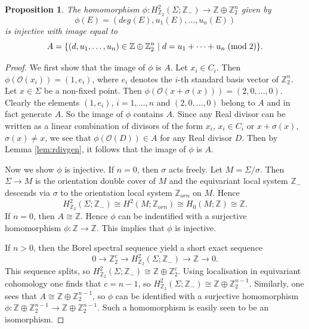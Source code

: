 \documentclass{amsart}
\newtheorem{proposition}[theorem]{Proposition}
\theoremstyle{definition}
\theoremstyle{remark}
\numberwithin{equation}{section}
\begin{document}
\begin{proposition}\label{prop:deg2}
The homomorphism $\phi : H^2_{\mathbb{Z}_2}(\Sigma ; \mathbb{Z}_-) \to \mathbb{Z} \oplus \mathbb{Z}_2^n$ given by
\[
\phi(E) = ( deg(E) , u_1(E) , \dots , u_n(E))
\]
is injective with image equal to 
\[
A = \{ (d , u_1 , \dots , u_n) \in \mathbb{Z} \oplus \mathbb{Z}_2^n \; | \; d = u_1 + \cdots + u_n \; ({\rm mod} \; 2) \}.
\]
\end{proposition}
\begin{proof}
We first show that the image of $\phi$ is $A$. Let $x_i \in C_i$. Then $\phi( \mathcal{O}(x_i) ) = (1 , e_i )$, where $e_i$ denotes the $i$-th standard basis vector of $\mathbb{Z}_2^n$. Let $x \in \Sigma$ be a non-fixed point. Then $\phi( \mathcal{O}(x+\sigma(x)) ) = (2 , 0 , \dots , 0)$. Clearly the elements $(1 , e_i)$, $i = 1, \dots , n$ and $(2 , 0 , \dots , 0)$ belong to $A$ and in fact generate $A$. So the image of $\phi$ contains $A$. Since any Real divisor can be written as a linear combination of divisors of the form $x_i$, $x_i \in C_i$ or $x + \sigma(x)$, $\sigma(x) \neq x$, we see that $\phi( \mathcal{O}(D) ) \in A$ for any Real divisor $D$. Then by Lemma \ref{lem:rdivgen}, it follows that the image of $\phi$ is $A$.

Now we show $\phi$ is injective. If $n = 0$, then $\sigma$ acts freely. Let $M = \Sigma/\sigma$. Then $\Sigma \to M$ is the orientation double cover of $M$ and the equivariant local system $\mathbb{Z}_-$ descends via $\sigma$ to the orientation local system $\mathbb{Z}_{orn}$ on $M$. Hence
\[
H^2_{\mathbb{Z}_2}(\Sigma ; \mathbb{Z}_-) \cong H^2(M ; \mathbb{Z}_{orn}) \cong H_0(M ; \mathbb{Z}) \cong \mathbb{Z}.
\]
If $n=0$, then $A \cong \mathbb{Z}$. Hence $\phi$ can be indentified with a surjective homomorphism $\phi : \mathbb{Z} \to \mathbb{Z}$. This implies that $\phi$ is injective.

If $n > 0$, then the Borel spectral sequence yield a short exact sequence
\[
0 \to \mathbb{Z}_2^c \to H^2_{\mathbb{Z}_2}(\Sigma ; \mathbb{Z}_-) \to \mathbb{Z} \to 0.
\]
This sequence splits, so $H^2_{\mathbb{Z}_2}(\Sigma ; \mathbb{Z}_-) \cong \mathbb{Z} \oplus \mathbb{Z}_2^c$. Using localisation in equivariant cohomology one finds that $c = n-1$, so $H^2_{\mathbb{Z}_2}(\Sigma ; \mathbb{Z}_-) \cong \mathbb{Z} \oplus \mathbb{Z}_2^{n-1}$. Similarly, one sees that $A \cong \mathbb{Z} \oplus \mathbb{Z}_2^{n-1}$, so $\phi$ can be identified with a surjective homomorphism $\phi : \mathbb{Z} \oplus \mathbb{Z}_2^{n-1} \to \mathbb{Z} \oplus \mathbb{Z}_2^{n-1}$. Such a homomorphism is easily seen to be an isomorphism.
\end{proof}
\end{document}
